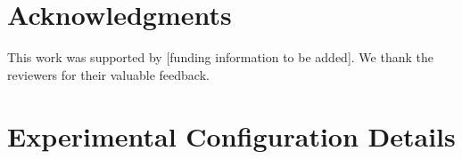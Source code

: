 \documentclass{article}
\begin{document}
\section*{Acknowledgments}

This work was supported by [funding information to be added]. We thank the reviewers for their valuable feedback.






\newpage

\clearpage

\appendix



\section{Experimental Configuration Details}
\label{app:config_details}


\end{document}
